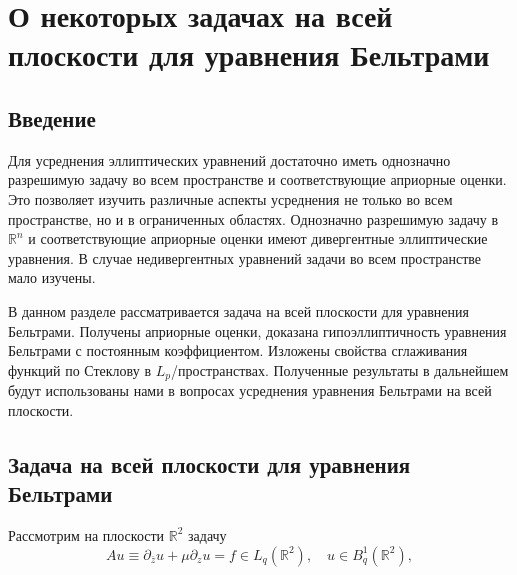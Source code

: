 \chapter{О некоторых задачах на всей плоскости для уравнения Бельтрами}


\section{Введение}
Для усреднения эллиптических уравнений достаточно иметь однозначно разрешимую задачу во всем пространстве и соответствующие априорные оценки. Это позволяет изучить различные  аспекты усреднения не только во всем пространстве, но и в ограниченных областях. Однозначно разрешимую задачу в $\mathbb{R}^n$ и соответствующие априорные оценки имеют дивергентные эллиптические уравнения. В случае недивергентных уравнений задачи во всем пространстве мало изучены. 

В данном разделе рассматривается задача на всей плоскости для уравнения Бельтрами. Получены априорные оценки, доказана гипоэллиптичность уравнения Бельтрами с постоянным коэффициентом. Изложены свойства сглаживания функций по Стеклову в $L_p$\-/пространствах. Полученные результаты в дальнейшем будут использованы нами в вопросах усреднения уравнения Бельтрами на всей плоскости.



\section{Задача на всей плоскости для уравнения Бельтрами}
	
Рассмотрим на плоскости $\mathbb{R}^2$ задачу
\begin{equation}\label{eq:smm-1}
  Au\equiv\partial_{\bar{z}}u+\mu\partial_z u=f\in L_q (\mathbb{R}^2),\quad u\in B_q^1 (\mathbb{R}^2),
\end{equation}
                                
